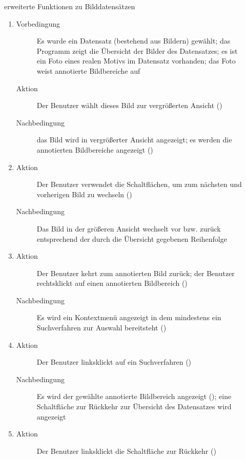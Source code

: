 \begin{description}
	\item[] erweiterte Funktionen zu Bilddatensätzen
	\begin{enumerate}
		\item
		\begin{description}
			\item[Vorbedingung] Es wurde ein Datensatz (bestehend aus Bildern) gewählt; das Programm zeigt die Übersicht der Bilder des Datensatzes; es ist ein Foto eines realen Motivs im Datensatz vorhanden; das Foto weist annotierte Bildbereiche auf
			\item[Aktion] Der Benutzer wählt dieses Bild zur vergrößerten Ansicht ()
			\item[Nachbedingung] das Bild wird in vergrößerter Ansicht angezeigt; es werden die annotierten Bildbereiche angezeigt ()
		\end{description}
		\item
		\begin{description}
			\item[Aktion] Der Benutzer verwendet die Schaltflächen, um zum nächsten und vorherigen Bild zu wechseln ()
			\item[Nachbedingung] Das Bild in der größeren Ansicht wechselt vor bzw. zurück entsprechend der durch die Übersicht gegebenen Reihenfolge
		\end{description}
		\item
		\begin{description}
			\item[Aktion] Der Benutzer kehrt zum annotierten Bild zurück; der Benutzer rechtsklickt auf einen annotierten Bildbereich ()
			\item[Nachbedingung] Es wird ein Kontextmenü angezeigt in dem mindestens ein Suchverfahren zur Auswahl bereitsteht ()
		\end{description}
		\item
		\begin{description}
			\item[Aktion] Der Benutzer linksklickt auf ein Suchverfahren ()
			\item[Nachbedingung] Es wird der gewählte annotierte Bildbereich angezeigt (); eine Schaltfläche zur Rückkehr zur Übersicht des Datensatzes wird angezeigt
		\end{description}
		\item
		\begin{description}
			\item[Aktion] Der Benutzer linksklickt die Schaltfläche zur Rückkehr ()

\end{description}
\end{enumerate}
\end{description}
